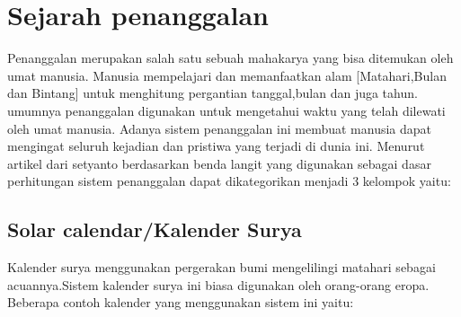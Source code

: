 

\section{Sejarah penanggalan}
  Penanggalan merupakan salah satu sebuah mahakarya yang bisa ditemukan oleh umat manusia. Manusia mempelajari dan memanfaatkan alam [Matahari,Bulan dan Bintang] untuk menghitung pergantian tanggal,bulan dan juga tahun.
umumnya penanggalan digunakan untuk mengetahui waktu yang telah dilewati oleh umat manusia. Adanya sistem penanggalan ini membuat manusia dapat mengingat seluruh kejadian dan pristiwa yang terjadi di dunia ini.
Menurut artikel dari setyanto berdasarkan benda langit yang digunakan sebagai dasar perhitungan sistem penanggalan dapat dikategorikan menjadi 3 kelompok yaitu:\cite{setyanto2015kriteria}

  \subsection{Solar calendar/Kalender Surya}
    Kalender surya menggunakan pergerakan bumi mengelilingi matahari sebagai acuannya.Sistem kalender surya ini biasa digunakan oleh orang-orang eropa. Beberapa contoh kalender yang menggunakan sistem ini yaitu:

